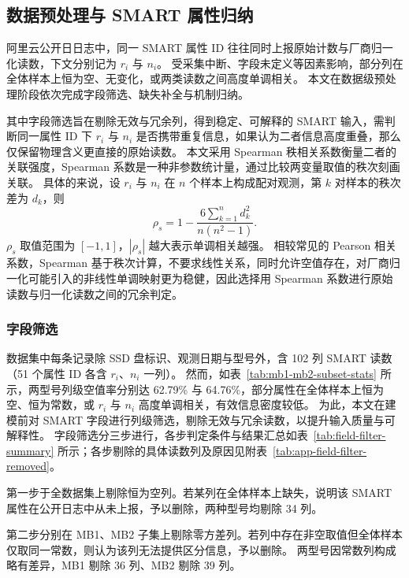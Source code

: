 \subsection{数据预处理与 SMART 属性归纳}

阿里云公开日日志中，同一 SMART 属性 ID 往往同时上报原始计数与厂商归一化读数，下文分别记为 $r_i$ 与 $n_i$。
受采集中断、字段未定义等因素影响，部分列在全体样本上恒为空、无变化，或两类读数之间高度单调相关。
本文在数据级预处理阶段依次完成字段筛选、缺失补全与机制归纳。

其中字段筛选旨在剔除无效与冗余列，得到稳定、可解释的 SMART 输入，需判断同一属性 ID 下 $r_i$ 与 $n_i$ 是否携带重复信息，如果认为二者信息高度重叠，那么仅保留物理含义更直接的原始读数。
本文采用 Spearman 秩相关系数衡量二者的关联强度，Spearman 系数是一种非参数统计量，通过比较两变量取值的秩次刻画关联。
具体的来说，设 $r_i$ 与 $n_i$ 在 $n$ 个样本上构成配对观测，第 $k$ 对样本的秩次差为 $d_k$，则
\begin{equation}
    \label{equ:spearman-rn}
    \rho_s = 1 - \frac{6\sum_{k=1}^{n} d_k^2}{n(n^2-1)}.
\end{equation}
$\rho_s$ 取值范围为 $[-1,1]$，$|\rho_s|$ 越大表示单调相关越强。
相较常见的 Pearson 相关系数，Spearman 基于秩次计算，不要求线性关系，同时允许空值存在，对厂商归一化可能引入的非线性单调映射更为稳健，因此选择用 Spearman 系数进行原始读数与归一化读数之间的冗余判定。

\subsubsection{字段筛选}
\label{sec:chap3-field-filter}

数据集中每条记录除 SSD 盘标识、观测日期与型号外，含 102 列 SMART 读数（51 个属性 ID 各含 $r_i$、$n_i$ 一列）。
然而，如表~\ref{tab:mb1-mb2-subset-stats} 所示，两型号列级空值率分别达 62.79\% 与 64.76\%，部分属性在全体样本上恒为空、恒为常数，或 $r_i$ 与 $n_i$ 高度单调相关，有效信息密度较低。
为此，本文在建模前对 SMART 字段进行列级筛选，剔除无效与冗余读数，以提升输入质量与可解释性。
字段筛选分三步进行，各步判定条件与结果汇总如表~\ref{tab:field-filter-summary} 所示；各步剔除的具体读数列及原因见附表~\ref{tab:app-field-filter-removed}。

第一步于全数据集上剔除恒为空列。若某列在全体样本上缺失，说明该 SMART 属性在公开日志中从未上报，予以删除，两种型号均剔除 34 列。

第二步分别在 MB1、MB2 子集上剔除零方差列。若列中存在非空取值但全体样本仅取同一常数，则认为该列无法提供区分信息，予以删除。
两型号因常数列构成略有差异，MB1 剔除 36 列、MB2 剔除 39 列。


